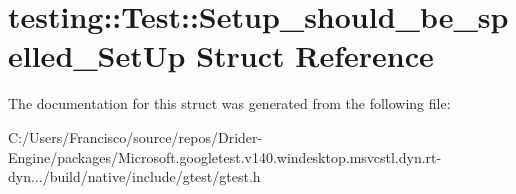 \hypertarget{structtesting_1_1_test_1_1_setup__should__be__spelled___set_up}{}\section{testing\+:\+:Test\+:\+:Setup\+\_\+should\+\_\+be\+\_\+spelled\+\_\+\+Set\+Up Struct Reference}
\label{structtesting_1_1_test_1_1_setup__should__be__spelled___set_up}


The documentation for this struct was generated from the following file\+:\begin{DoxyCompactItemize}
\item 
C\+:/\+Users/\+Francisco/source/repos/\+Drider-\/\+Engine/packages/\+Microsoft.\+googletest.\+v140.\+windesktop.\+msvcstl.\+dyn.\+rt-\/dyn.../build/native/include/gtest/gtest.\+h\end{DoxyCompactItemize}
